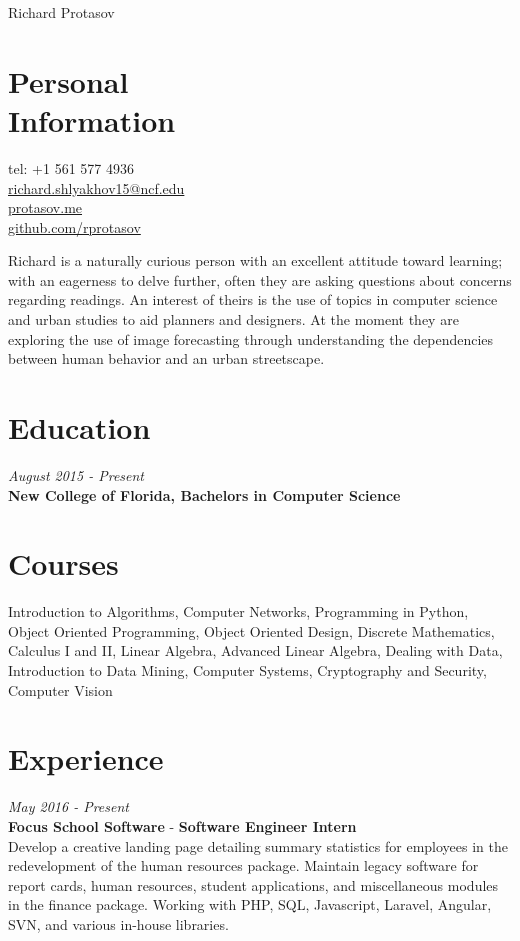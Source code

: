 \documentclass[margin,line,a4paper]{resume}
\begin{document}
{\sc \Huge Richard Protasov}
\begin{resume}
    \vspace{0.5cm}

    \section{\mysidestyle Personal\\Information}%
    tel: +1 561 577 4936 \\
    \href{mailto:richard.shlyakhov15@ncf.edu}{richard.shlyakhov15@ncf.edu} \\
    \href{http://protasov.me}{protasov.me}\\
    \href{https://github.com/rprotasov}{github.com/rprotasov}
    
     Richard is a naturally curious person with an excellent attitude toward learning; with an eagerness to delve further, often they are asking questions about concerns regarding readings. An interest of theirs is the use of topics in computer science and urban studies to aid planners and designers. At the moment they are exploring the use of image forecasting through understanding the dependencies between human behavior and an urban streetscape.
    
    \section{\mysidestyle Education}
        \textit{August 2015 - Present}\\
        \textbf{New College of Florida, Bachelors in Computer Science}
        
    \section{\mysidestyle Courses}
        Introduction to Algorithms, Computer Networks, Programming in Python, Object Oriented Programming, Object Oriented Design, Discrete Mathematics, Calculus I and II, Linear Algebra, Advanced Linear Algebra, Dealing with Data, Introduction to Data Mining, Computer Systems, Cryptography and Security, Computer Vision
    
    \section{\mysidestyle Experience}
        \textit{May 2016 - Present}\\
        \textbf{Focus School Software} - \textbf{Software Engineer Intern}\\
        Develop a creative landing page detailing summary statistics for employees in the redevelopment of the human resources package. Maintain legacy software for report cards, human resources, student applications, and miscellaneous modules in the finance package.  Working with PHP, SQL, Javascript, Laravel, Angular, SVN, and various in-house libraries. 
            

\end{resume}
\end{document}
